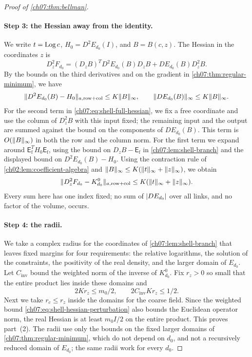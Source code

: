 \begin{proof}[Proof of \cref{ch07:thm:bellman}]
\paragraph{Step 3: the Hessian away from the identity.}
We write $t=\operatorname{Log} c$, $H_0=D^2E_{d_0}(I)$, and $B=B(c,z)$. The Hessian in the coordinates $z$ is
\begin{equation}\label{ch07:eq:shell-full-hessian}
 D_z^2F_{d_0}=(D_zB)^TD^2E_{d_0}(B)D_zB+DE_{d_0}(B)D_z^2B .
\end{equation}
By the bounds on the third derivatives and on the gradient in \cref{ch07:thm:regular-minimum}, we have
\[
 \lVert D^2E_{d_0}(B)-H_0\rVert_{a,\mathrm{row+col}}\le K\lVert B\rVert_\infty,\qquad\lVert DE_{d_0}(B)\rVert_\infty\le K\lVert B\rVert_\infty .
\]
For the second term in \eqref{ch07:eq:shell-full-hessian}, we fix a free coordinate and use the column of $D_z^2B$ with this input fixed; the remaining input and the output are summed against the bound on the components of $DE_{d_0}(B)$. This term is $O(\lVert B\rVert_\infty)$ in both the row and the column norm. For the first term we expand around $\mathsf E_{\mathrm f}^TH_0\mathsf E_{\mathrm f}$, using the bound on $D_zB-\mathsf E_{\mathrm f}$ in \cref{ch07:lem:shell-branch} and the displayed bound on $D^2E_{d_0}(B)-H_0$. Using the contraction rule of \cref{ch02:lem:coefficient-algebra} and $\lVert B\rVert_\infty\le K(\lVert t\rVert_\infty+\lVert z\rVert_\infty)$, we obtain
\begin{equation}\label{ch07:eq:shell-hessian-perturbation}
 \lVert D_z^2F_{d_0}-K_{d_0}^0\rVert_{a,\mathrm{row+col}}\le K(\lVert t\rVert_\infty+\lVert z\rVert_\infty).
\end{equation}
Every sum here has one index fixed; no sum of $\lvert DE_{d_0}\rvert$ over all links, and no factor of the volume, occurs.

\paragraph{Step 4: the radii.}
We take a complex radius for the coordinates of \cref{ch07:lem:shell-branch} that leaves fixed margins for four requirements: the relative logarithms, the solution of the constraints, the positivity of the real density, and the larger domain of $E_{d_0}$. Let $C_{\mathrm{inv}}$ bound the weighted norm of the inverse of $K_{d_0}^0$. Fix $r_z>0$ so small that the entire product lies inside these domains and
\[
 2Kr_z\le m_0/2,\qquad 2C_{\mathrm{inv}}Kr_z\le1/2 .
\]
Next we take $r_c\le r_z$ inside the domains for the coarse field. Since the weighted bound \eqref{ch07:eq:shell-hessian-perturbation} also bounds the Euclidean operator norm, the real Hessian is at least $m_0I/2$ on the entire product. This proves part~(2). The radii use only the bounds on the fixed larger domains of \cref{ch07:thm:regular-minimum}, which do not depend on $d_0$, and not a recursively reduced domain of $E_{d_0}$; the same radii work for every $d_0$.


\end{proof}
